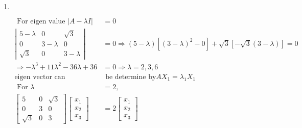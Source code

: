 \begin{enumerate}
\begin{answer}
\begin{align*}
\begin{array}{l}
		x_{1} \\
		x_{2} \\
		x_{3}
		\end{array}\right]=2\left[\begin{array}{l}
		x_{1} \\
		x_{2} \\
		x_{3}
		\end{array}\right] \Rightarrow x_{1}+x_{2}=2 x_{1}, x_{3}&=0 \Rightarrow x_{1}=x_{2} \Rightarrow X_{3}=\left[\begin{array}{c}
		x_{2} \\
		x_{2} \\
		0
		\end{array}\right]\\
		\text{From orthogonality condition }X_{3}{ }^{T} X_{3}&=1 \Rightarrow x_{2}=\frac{1}{\sqrt{2}} \Rightarrow X_{3}=\frac{1}{\sqrt{2}}\left[\begin{array}{l}1 \\ 1 \\ 0\end{array}\right]
		\end{align*}
			So the correct answers are \textbf{Option (a),(b),(c)and (d)}
	\end{answer}
	\item $\left. \right. $	
	\begin{answer}
		\begin{align*}
	\text{	For eigen value }|A-\lambda I|&=0\\
	\left|\begin{array}{ccc}5-\lambda & 0 & \sqrt{3} \\ 0 & 3-\lambda & 0 \\ \sqrt{3} & 0 & 3-\lambda\end{array}\right|&=0 \Rightarrow(5-\lambda)\left[(3-\lambda)^{2}-0\right]+\sqrt{3}[-\sqrt{3}(3-\lambda)]=0\\
	\Rightarrow-\lambda^{3}+11 \lambda^{2}-36 \lambda+36&=0 \Rightarrow \lambda=2,3,6\\
	\text{eigen vector can  }&\text{ be determine by}A X_{1}=\lambda_{1} X_{1}\\
	\text{	For }\lambda&=2,\\
	\left[\begin{array}{ccc}5 & 0 & \sqrt{3} \\ 0 & 3 & 0 \\ \sqrt{3} & 0 & 3\end{array}\right]\left[\begin{array}{l}x_{1} \\ x_{2} \\ x_{3}\end{array}\right]&=2\left[\begin{array}{l}x_{1} \\ x_{2} \\ x_{3}\end{array}\right]\\

\end{align*}
\end{answer}
\end{enumerate}
